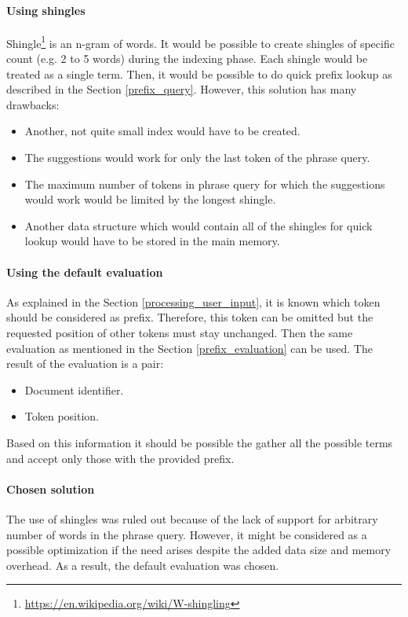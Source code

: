 \paragraph{Using shingles}
Shingle\footnote{\url{https://en.wikipedia.org/wiki/W-shingling}} is an n-gram of words. It would be possible to create
shingles of specific count (e.g. 2 to 5 words) during the indexing phase. Each shingle would be treated as a single term.
Then, it would be possible to do quick prefix lookup as described in the Section \ref{prefix_query}. However, this solution has many drawbacks:
\begin{itemize}
    \item Another, not quite small index would have to be created.
    \item The suggestions would work for only the last token of the phrase query.
    \item The maximum number of tokens in phrase query for which the suggestions would work would be limited by the longest
    shingle.
    \item Another data structure which would contain all of the shingles for quick lookup would have to be stored in the
    main memory.
\end{itemize}

\paragraph{Using the default evaluation}
As explained in the Section \ref{processing_user_input}, it is known which token should be considered as prefix. Therefore, this token
can be omitted but the requested position of other tokens must stay unchanged. Then the same evaluation as mentioned in
the Section \ref{prefix_evaluation} can be used. The result of the evaluation is a pair:
\begin{itemize}
    \item Document identifier.
    \item Token position.
\end{itemize}
Based on this information it should be possible the gather all the possible terms and accept only those with the
provided prefix.

\paragraph{Chosen solution} The use of shingles was ruled out because of the lack of support for arbitrary number of words
in the phrase query. However, it might be considered as a possible optimization if the need arises despite the added
data size and memory overhead. As a result, the default evaluation was chosen.

